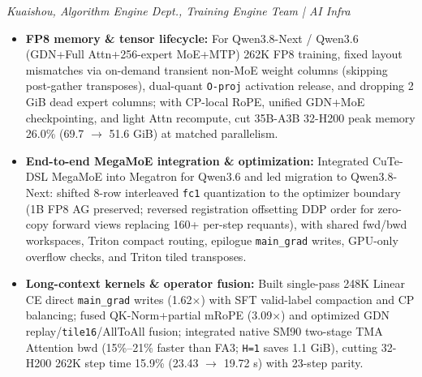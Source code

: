 \documentclass{resume}
\begin{document}
{\small\itshape Kuaishou, Algorithm Engine Dept., Training Engine Team | AI Infra\par}
\begin{itemize}[parsep=0.25ex]
  \item \textbf{FP8 memory \& tensor lifecycle:} For Qwen3.8-Next / Qwen3.6 (GDN+Full Attn+256-expert MoE+MTP) 262K FP8 training, fixed layout mismatches via on-demand transient non-MoE weight columns (skipping post-gather transposes), dual-quant \texttt{O-proj} activation release, and dropping 2 GiB dead expert columns; with CP-local RoPE, unified GDN+MoE checkpointing, and light Attn recompute, cut 35B-A3B 32-H200 peak memory 26.0\% (69.7 $\to$ 51.6 GiB) at matched parallelism.
  \item \textbf{End-to-end MegaMoE integration \& optimization:} Integrated CuTe-DSL MegaMoE into Megatron for Qwen3.6 and led migration to Qwen3.8-Next: shifted 8-row interleaved \texttt{fc1} quantization to the optimizer boundary (1B FP8 AG preserved; reversed registration offsetting DDP order for zero-copy forward views replacing 160+ per-step requants), with shared fwd/bwd workspaces, Triton compact routing, epilogue \texttt{main\_grad} writes, GPU-only overflow checks, and Triton tiled transposes.
  \item \textbf{Long-context kernels \& operator fusion:} Built single-pass 248K Linear CE direct \texttt{main\_grad} writes (1.62$\times$) with SFT valid-label compaction and CP balancing; fused QK-Norm+partial mRoPE (3.09$\times$) and optimized GDN replay/\texttt{tile16}/AllToAll fusion; integrated native SM90 two-stage TMA Attention bwd (15\%--21\% faster than FA3; \texttt{H=1} saves 1.1 GiB), cutting 32-H200 262K step time 15.9\% (23.43 $\to$ 19.72 s) with 23-step parity.
\end{itemize}
\end{document}
